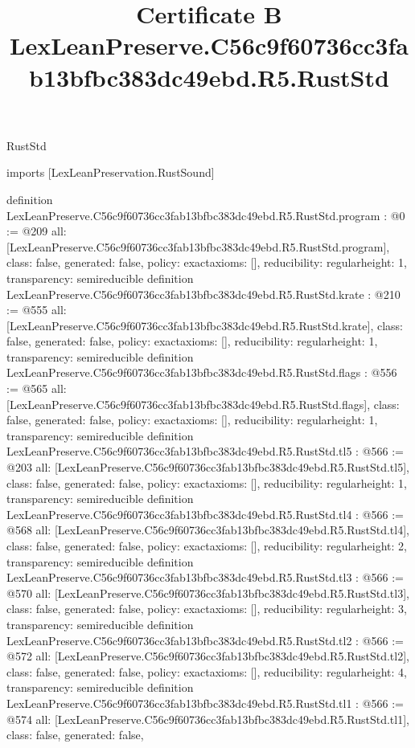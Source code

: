 \begin{lexlean}{RustStd}
\title{Certificate B LexLeanPreserve.C56c9f60736cc3fab13bfbc383dc49ebd.R5.RustStd}
\begin{coremodule}
imports [LexLeanPreservation.RustSound]

definition LexLeanPreserve.C56c9f60736cc3fab13bfbc383dc49ebd.R5.RustStd.program : @0 := @209 {
  all: [LexLeanPreserve.C56c9f60736cc3fab13bfbc383dc49ebd.R5.RustStd.program],
  class: false,
  generated: false,
  policy: exact{axioms: []},
  reducibility: regular{height: 1},
  transparency: semireducible
}
definition LexLeanPreserve.C56c9f60736cc3fab13bfbc383dc49ebd.R5.RustStd.krate : @210 := @555 {
  all: [LexLeanPreserve.C56c9f60736cc3fab13bfbc383dc49ebd.R5.RustStd.krate],
  class: false,
  generated: false,
  policy: exact{axioms: []},
  reducibility: regular{height: 1},
  transparency: semireducible
}
definition LexLeanPreserve.C56c9f60736cc3fab13bfbc383dc49ebd.R5.RustStd.flags : @556 := @565 {
  all: [LexLeanPreserve.C56c9f60736cc3fab13bfbc383dc49ebd.R5.RustStd.flags],
  class: false,
  generated: false,
  policy: exact{axioms: []},
  reducibility: regular{height: 1},
  transparency: semireducible
}
definition LexLeanPreserve.C56c9f60736cc3fab13bfbc383dc49ebd.R5.RustStd.tl5 : @566 := @203 {
  all: [LexLeanPreserve.C56c9f60736cc3fab13bfbc383dc49ebd.R5.RustStd.tl5],
  class: false,
  generated: false,
  policy: exact{axioms: []},
  reducibility: regular{height: 1},
  transparency: semireducible
}
definition LexLeanPreserve.C56c9f60736cc3fab13bfbc383dc49ebd.R5.RustStd.tl4 : @566 := @568 {
  all: [LexLeanPreserve.C56c9f60736cc3fab13bfbc383dc49ebd.R5.RustStd.tl4],
  class: false,
  generated: false,
  policy: exact{axioms: []},
  reducibility: regular{height: 2},
  transparency: semireducible
}
definition LexLeanPreserve.C56c9f60736cc3fab13bfbc383dc49ebd.R5.RustStd.tl3 : @566 := @570 {
  all: [LexLeanPreserve.C56c9f60736cc3fab13bfbc383dc49ebd.R5.RustStd.tl3],
  class: false,
  generated: false,
  policy: exact{axioms: []},
  reducibility: regular{height: 3},
  transparency: semireducible
}
definition LexLeanPreserve.C56c9f60736cc3fab13bfbc383dc49ebd.R5.RustStd.tl2 : @566 := @572 {
  all: [LexLeanPreserve.C56c9f60736cc3fab13bfbc383dc49ebd.R5.RustStd.tl2],
  class: false,
  generated: false,
  policy: exact{axioms: []},
  reducibility: regular{height: 4},
  transparency: semireducible
}
definition LexLeanPreserve.C56c9f60736cc3fab13bfbc383dc49ebd.R5.RustStd.tl1 : @566 := @574 {
  all: [LexLeanPreserve.C56c9f60736cc3fab13bfbc383dc49ebd.R5.RustStd.tl1],
  class: false,
  generated: false,
}
\end{coremodule}
\end{lexlean}
